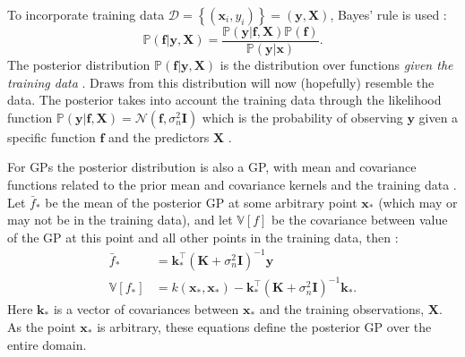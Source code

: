 To incorporate training data $\mathcal{D}=\left\{(\mathbf{x}_{i}, y_{i})\right\} = (\mathbf{y}, \mathbf{X})$, Bayes' rule is used \cite{rasmussenGaussianProcessesMachine2006}:
\begin{equation}\label{eqn:ya_boy_bayes}
    \mathbb{P}(\mathbf{f}|\mathbf{y}, \mathbf{X})  = \frac{\mathbb{P}(\mathbf{y}|\mathbf{f}, \mathbf{X})\mathbb{P}(\mathbf{f})}{\mathbb{P}(\mathbf{y}|\mathbf{x})}. 
\end{equation}
The posterior distribution $\mathbb{P}(\mathbf{f}|\mathbf{y}, \mathbf{X})$ is the distribution over functions \emph{given the training data} \cite{gelmanBayesianDataAnalysis2014}. Draws from this distribution will now (hopefully) resemble the data. The posterior takes into account the training data  through the likelihood function $\mathbb{P}(\mathbf{y}|\mathbf{f}, \mathbf{X}) = \mathcal{N}(\mathbf{f}, \sigma_{n}^{2}\mathbf{I})$ which is the probability of observing $\mathbf{y}$ given a specific function $\mathbf{f}$ and the predictors $\mathbf{X}$ \cite{gelmanBayesianDataAnalysis2014}.

For GPs the posterior distribution is also a GP, with mean and covariance functions related to the prior mean and covariance kernels and the training data \cite{rasmussenGaussianProcessesMachine2006}. Let $\bar{f}_{*}$ be the mean of the posterior GP at some arbitrary point $\mathbf{x}_{*}$ (which may or may not be in the training data), and let $\mathbb{V}\left[f\right]$ be the covariance between value of the GP at this point and all other points in the training data, then \cite{rasmussenGaussianProcessesMachine2006}:
\begin{equation}\label{eqn:gp_pred_dist}
\begin{aligned}
\bar{f}_{*} &=\mathbf{k}_{*}^{\top}\left(\mathbf{K}+\sigma_{n}^{2} \mathbf{I}\right)^{-1} \mathbf{y} \\
\mathbb{V}\left[f_{*}\right] &=k\left(\mathbf{x}_{*}, \mathbf{x}_{*}\right)-\mathbf{k}_{*}^{\top}\left(\mathbf{K}+\sigma_{n}^{2} \mathbf{I}\right)^{-1} \mathbf{k}_{*}.
\end{aligned}
\end{equation}
Here $\mathbf{k}_{*}$ is a vector of covariances between $\mathbf{x}_{*}$ and the training observations, $\mathbf{X}$. As the point $\mathbf{x}_{*}$ is arbitrary, these equations define the posterior GP over the entire domain. 

